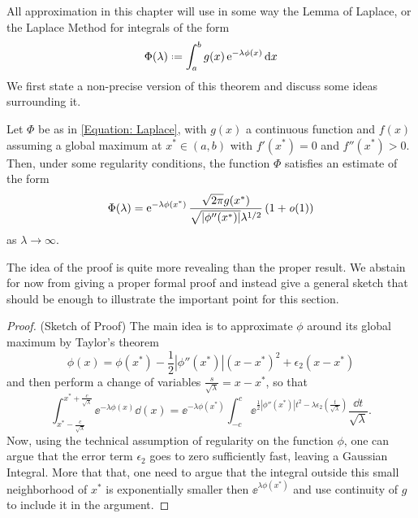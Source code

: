 All approximation in this chapter will use in some way the Lemma of Laplace, or the Laplace Method for integrals of the form
\begin{equation}
	\Phi(\lambda) \deff \int_{a}^{b} g(x) \ee^{-\lambda \phi(x)} \dd x
	\label{Equation: Laplace}
\end{equation}
We first state a non-precise version of this theorem and discuss some ideas surrounding it.
\begin{thm}
	Let $\Phi$ be as in \eqref{Equation: Laplace}, with $g(x)$ a continuous function and $f(x)$ assuming a global maximum at $x^* \in (a,b)$ with $f'(x^*) = 0$ and $f''(x^*) > 0$. Then, under some regularity conditions, the function $\Phi$ satisfies an estimate of the form
	\begin{equation}
		\Phi(\lambda) = \operatorname{e}^{-\lambda \phi(x^*)} \frac{\sqrt{2\pi} g(x^*)}{\sqrt{|\phi''(x^*)|}\lambda^{1/2}} \left( 1 + \mathit{o}(1)\right)
	\end{equation}
	as $\lambda \rightarrow \infty$.
	\label{Prop: Non-formal Laplace's Method}
\end{thm}

The idea of the proof is quite more revealing than the proper result. We abstain for now from giving a proper formal proof and instead give a general sketch that should be enough to illustrate the important point for this section.

\begin{proof}
	(Sketch of Proof) The main idea is to approximate $\phi$ around its global maximum by Taylor's theorem 
	\begin{equation}
		\phi(x) = \phi(x^*) - \frac{1}{2} |\phi''(x^*)|(x-x^*)^2 + \epsilon_2(x-x^*)
	\end{equation}
	and then perform a change of variables $\frac{s}{\sqrt{\lambda}} = x - x^*$, so that 
	\begin{equation}
		\int_{x^*-\frac{c}{\sqrt{\lambda}}}^{x^*+\frac{c}{\sqrt{\lambda}}} \ee^{-\lambda \phi(x)} \dd(x) = \ee^{-\lambda \phi(x^*)} \int_{-c}^c \ee^{\frac{1}{2} |\phi''(x^*)|t^2 - \lambda \epsilon_2\left(\frac{t}{\sqrt{\lambda}}\right)} \frac{\dd t}{\sqrt{\lambda}}.
	\end{equation}
	Now, using the technical assumption of regularity on the function $\phi$, one can argue that the error term $\epsilon_2$ goes to zero sufficiently fast, leaving a Gaussian Integral. More that that, one need to argue that the integral outside this small neighborhood of $x^*$ is exponentially smaller then $\ee^{\lambda \phi(x^*)}$ and use continuity of $g$ to include it in the argument.
\end{proof}

